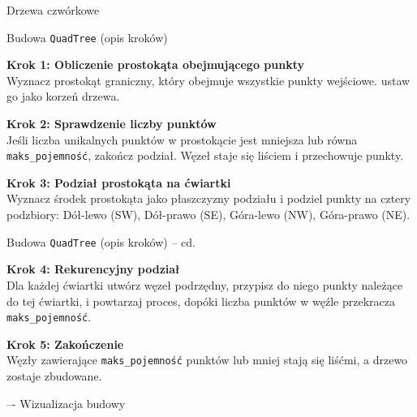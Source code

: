 \documentclass[aspectratio=1610, polish]{beamer}
\begin{document}
\begin{section}{Drzewa czwórkowe }
\begin{frame}
    \end{frame}
\begin{frame}{Budowa \texttt{QuadTree} (opis kroków)}

\begin{mdframed}
\textbf{Krok 1: Obliczenie prostokąta obejmującego punkty}\\[3pt]
Wyznacz prostokąt graniczny, który obejmuje wszystkie punkty wejściowe.
ustaw go jako korzeń drzewa.
\end{mdframed}

\begin{mdframed}
\textbf{Krok 2: Sprawdzenie liczby punktów}\\[3pt]
Jeśli liczba unikalnych punktów w prostokącie jest mniejsza lub równa \\\texttt{maks\_pojemność}, zakończ podział. Węzeł staje się liściem i przechowuje punkty.
\end{mdframed}

\begin{mdframed}
\textbf{Krok 3: Podział prostokąta na ćwiartki}\\[3pt]
Wyznacz środek prostokąta jako płaszczyzny podziału i podziel punkty na cztery podzbiory: Dół-lewo (SW), Dół-prawo (SE), Góra-lewo (NW), Góra-prawo (NE).
\end{mdframed}

\end{frame}
\begin{frame}{Budowa \texttt{QuadTree} (opis kroków) -- cd.}
\begin{mdframed}
\textbf{Krok 4: Rekurencyjny podział}\\[3pt]
Dla każdej ćwiartki utwórz węzeł podrzędny, przypisz do niego punkty należące do tej ćwiartki, i powtarzaj proces, dopóki liczba punktów w węźle przekracza \texttt{maks\_pojemność}.
\end{mdframed}

\begin{mdframed}
\textbf{Krok 5: Zakończenie}\\[3pt]
Węzły zawierające \texttt{maks\_pojemność} punktów lub mniej stają się liśćmi, a drzewo zostaje zbudowane.
\end{mdframed}

\end{frame}

\begin{frame}{ –- Wizualizacja budowy}

    \centering
\end{frame}


\end{section}
\end{document}
